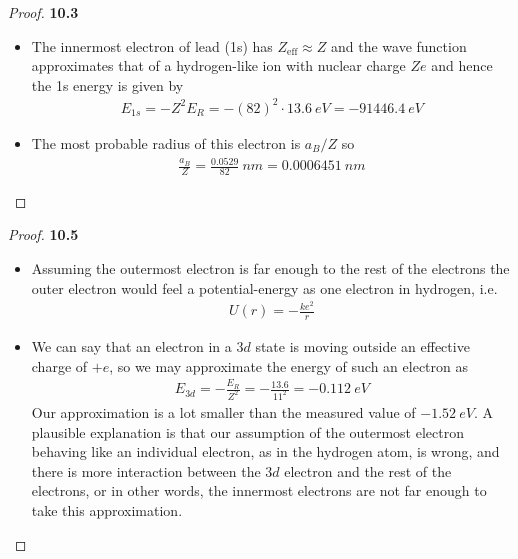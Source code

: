 \documentclass[11pt]{article}
\theoremstyle{definition}
\begin{document}
\cleardoublepage
\begin{proof}{\textbf{10.3}}
\begin{itemize}
\item [\textbf{(a)}]
The innermost electron of lead (1s) has $Z_{\text{eff}} \approx Z$ and the
wave function approximates that of a hydrogen-like ion with nuclear charge $Ze$
and hence the 1s energy is given by
\begin{align*}
    E_{1s} = -Z^2E_R = - (82)^2 \cdot 13.6 ~eV = -91446.4~eV
\end{align*}

\item [\textbf{(b)}] The most probable radius of this electron is $a_B/Z$ so
\begin{align*}
    \frac{a_B}{Z} = \frac{0.0529}{82}~nm = 0.0006451~nm
\end{align*}
\end{itemize}
\end{proof}

\cleardoublepage
\begin{proof}{\textbf{10.5}}
\begin{itemize}
\item [\textbf{(a)}] Assuming the outermost electron is far enough to
the rest of the electrons the outer electron would feel a potential-energy
as one electron in hydrogen, i.e.
\begin{align*}
    U(r) = -\frac{ke^2}{r}
\end{align*}
\item [\textbf{(b)}] We can say that an electron in a $3d$ state is moving
outside an effective charge of $+e$, so we may approximate the energy of such
an electron as
\begin{align*}
    E_{3d} = -\frac{E_R}{Z^2} = -\frac{13.6}{11^2} = -0.112~eV
\end{align*}
Our approximation is a lot smaller than the measured value of $-1.52~eV$.
A plausible explanation is that our assumption of the outermost electron
behaving like an individual electron, as in the hydrogen atom, is wrong,
and there is more interaction between the $3d$ electron and the rest of the
electrons, or in other words, the innermost electrons are not far enough to
take this approximation.
\end{itemize}
\end{proof}
\end{document}
